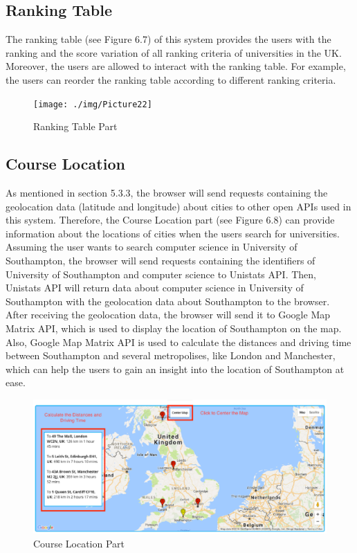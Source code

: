 \subsection{Ranking Table}

The ranking table (see Figure 6.7) of this system provides the users with the ranking and the score variation of all ranking criteria of universities in the UK. Moreover, the users are allowed to interact with the ranking table. For example, the users can reorder the ranking table according to different ranking criteria. 

\begin{figure}[H]
  \centering
  \texttt{[image: ./img/Picture22]}
  \caption{Ranking Table Part}
  \label{Figure:figex}
\end{figure}


\subsection{Course Location}

As mentioned in section 5.3.3, the browser will send requests containing the geolocation data (latitude and longitude) about cities to other open APIs used in this system. Therefore, the Course Location part (see Figure 6.8) can provide information about the locations of cities when the users search for universities. Assuming the user wants to search computer science in University of Southampton, the browser will send requests containing the identifiers of University of Southampton and computer science to Unistats API. Then, Unistats API will return data about computer science in University of Southampton with the geolocation data about Southampton to the browser. After receiving the geolocation data, the browser will send it to Google Map Matrix API, which is used to display the location of Southampton on the map. Also, Google Map Matrix API is used to calculate the distances and driving time between Southampton and several metropolises, like London and Manchester, which can help the users to gain an insight into the location of Southampton at ease.

\begin{figure}[H]
  \centering
  \includegraphics[width=15cm]{./img/Picture23}
  \caption{Course Location Part}
  \label{Figure:figex}
\end{figure}


